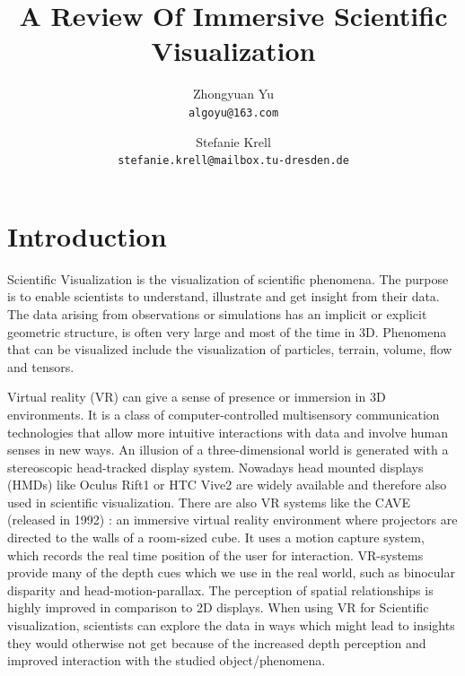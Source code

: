 \documentclass[10pt,twocolumn,letterpaper]{article}
\begin{document}
\title{A Review Of Immersive Scientific Visualization}

\author{Zhongyuan Yu\\
{\tt\small algoyu@163.com}
\and
Stefanie Krell\\
{\tt\small stefanie.krell@mailbox.tu-dresden.de}
}

\maketitle


\section{Introduction}
Scientific Visualization is the visualization of scientific phenomena. The purpose is to enable scientists to understand, illustrate and get insight from their data. The data arising from observations or simulations has an implicit or explicit geometric structure, is often very large and most of the time in 3D. Phenomena that can be visualized include the visualization of particles, terrain, volume, flow and tensors.

\setlength{\parindent}{1pc}Virtual reality (VR) can give a sense of presence or immersion in 3D environments. It is a class of computer-controlled multisensory communication technologies that allow more intuitive interactions with data and involve human senses in new ways. An illusion of a three-dimensional world is generated with a stereoscopic head-tracked display system. Nowadays head mounted displays (HMDs) like Oculus Rift1 or HTC Vive2 are widely available and therefore also used in scientific visualization. There are also VR systems like the CAVE (released in 1992) \cite{cruz1992cave}: an immersive virtual reality environment where projectors are directed to the walls of a room-sized cube. It uses a motion capture system, which records the real time position of the user for interaction. VR-systems provide many of the depth cues which we use in the real world, such as binocular disparity and head-motion-parallax. The perception of spatial relationships is highly improved in comparison to 2D displays. When using VR for Scientific visualization, scientists can explore the data in ways which might lead to insights they would otherwise not get because of the increased depth perception and improved interaction with the studied object/phenomena. 
\end{document}
